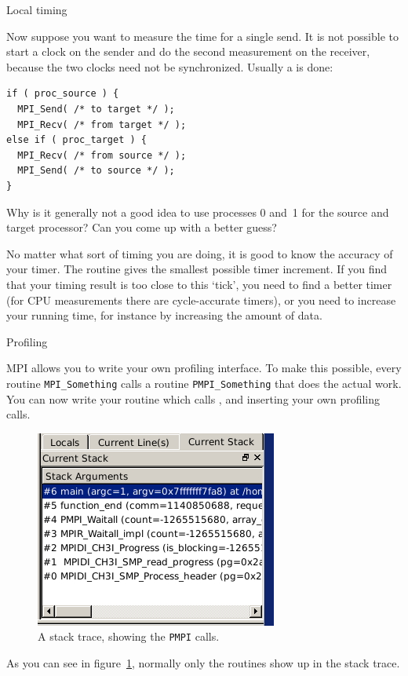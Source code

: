  {Local timing}
\label{sec:ping-time}

Now suppose you want to measure the time for a single send. It is not possible
to start a clock on the sender and do the second measurement on the receiver,
because the two clocks need not be synchronized. Usually a  is 
done: 
\begin{lstlisting}
if ( proc_source ) {
  MPI_Send( /* to target */ );
  MPI_Recv( /* from target */ );
else if ( proc_target ) {
  MPI_Recv( /* from source */ );
  MPI_Send( /* to source */ );
}
\end{lstlisting}

\begin{exercise}
  Why is it generally not a good idea to use processes 0 and~1 for the
  source and target processor?  Can you come up with a better guess?
\end{exercise}

No matter what sort of timing you are doing, it is good to know the accuracy of your timer.
The routine  gives the smallest possible timer increment.
If you find that your timing result is too close to this `tick', you need to find a better timer
(for CPU measurements there are cycle-accurate timers), or you need to increase
your running time, for instance by increasing the amount of data.


 {Profiling}
\label{sec:profile}

MPI allows you to write your own profiling interface. To make this possible,
every routine \lstinline{MPI_Something} calls a routine \lstinline{PMPI_Something} that 
does the actual work. You can now write your  routine
which calls , and inserting your own profiling calls.
\begin{figure}[ht]
  \includegraphics[scale=.7]{graphics/pmpi}
  \caption{A stack trace, showing the \texttt{PMPI} calls.}
  \label{fig:pmpi}
\end{figure}
As you can see in figure~\ref{fig:pmpi}, normally only the  routines
show up in the stack trace.

